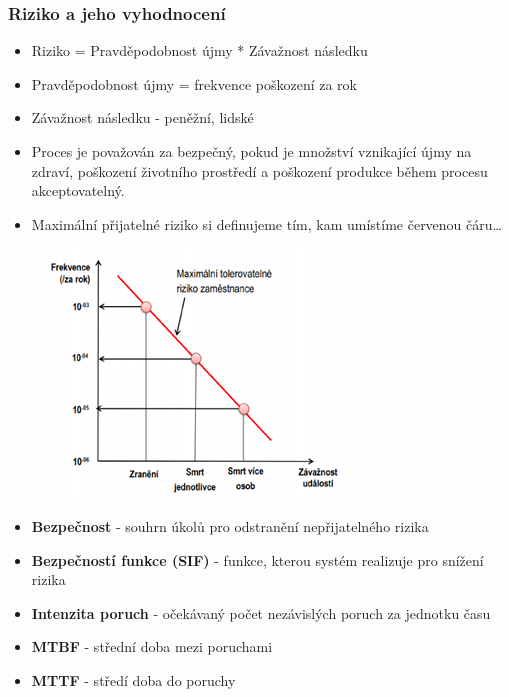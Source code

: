 \subsubsection*{Riziko a jeho vyhodnocení}
\begin{itemize}
  \item Riziko = Pravděpodobnost újmy * Závažnost následku
  \item Pravděpodobnost újmy = frekvence poškození za rok
  \item Závažnost následku - peněžní, lidské
  \item Proces je považován za bezpečný, pokud je množství vznikající újmy na zdraví, poškození životního prostředí a poškození produkce během procesu akceptovatelný.
  \item Maximální přijatelné riziko si definujeme tím, kam umístíme červenou čáru\dots
\end{itemize}

\begin{figure}[h]
  \begin{center}
    \includegraphics[scale = 1]{img/Picture20.png}
  \end{center}
\end{figure}

\begin{itemize}
  \item \textbf{Bezpečnost} - souhrn úkolů pro odstranění nepřijatelného rizika
  \item \textbf{Bezpečností funkce (SIF)} - funkce, kterou systém realizuje pro snížení rizika
  \item \textbf{Intenzita poruch} - očekávaný počet nezávislých poruch za jednotku času
  \item \textbf{MTBF} - střední doba mezi poruchami
  \item \textbf{MTTF} - středí doba do poruchy  
\end{itemize}


